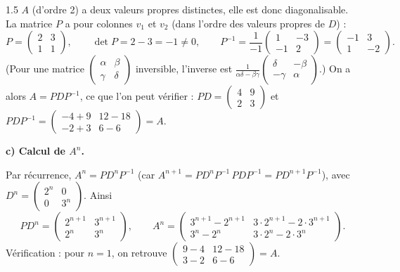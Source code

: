 \documentclass[12pt]{article}
\begin{document}
\begin{spacing}{1.5}
$A$ (d'ordre 2) a deux valeurs propres distinctes, elle est donc diagonalisable. La matrice $P$ a pour colonnes $v_1$ et $v_2$ (dans l'ordre des valeurs propres de $D$) :
\[
P=\begin{pmatrix}2&3\\1&1\end{pmatrix},\qquad \det P=2-3=-1\neq0,
\qquad P^{-1}=\frac{1}{-1}\begin{pmatrix}1&-3\\-1&2\end{pmatrix}=\begin{pmatrix}-1&3\\1&-2\end{pmatrix}.
\]
(Pour une matrice $\begin{pmatrix}\alpha&\beta\\\gamma&\delta\end{pmatrix}$ inversible, l'inverse est $\frac{1}{\alpha\delta-\beta\gamma}\begin{pmatrix}\delta&-\beta\\-\gamma&\alpha\end{pmatrix}$.) On a alors $A=PDP^{-1}$, ce que l'on peut vérifier : $PD=\begin{pmatrix}4&9\\2&3\end{pmatrix}$ et $PDP^{-1}=\begin{pmatrix}-4+9&12-18\\-2+3&6-6\end{pmatrix}=A$.

\textbf{c) Calcul de $A^n$.}

Par récurrence, $A^n=PD^nP^{-1}$ (car $A^{n+1}=PD^nP^{-1}\,PDP^{-1}=PD^{n+1}P^{-1}$), avec $D^n=\begin{pmatrix}2^n&0\\0&3^n\end{pmatrix}$. Ainsi
\[
PD^n=\begin{pmatrix}2^{n+1}&3^{n+1}\\2^n&3^n\end{pmatrix},\qquad
\boxed{A^n=\begin{pmatrix}
3^{n+1}-2^{n+1} & 3\cdot2^{n+1}-2\cdot3^{n+1}\\
3^n-2^n & 3\cdot2^{n}-2\cdot3^{n}
\end{pmatrix}}.
\]
Vérification : pour $n=1$, on retrouve $\begin{pmatrix}9-4&12-18\\3-2&6-6\end{pmatrix}=A$.


\end{spacing}
\end{document}
